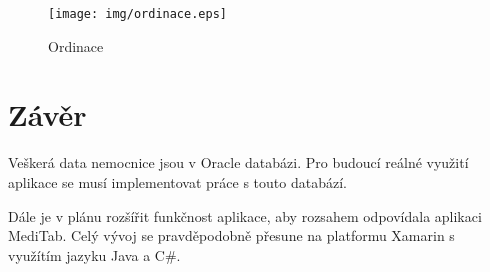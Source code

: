 \begin{figure}[H]
	\centering
	\texttt{[image: img/ordinace.eps]}
	\caption{Ordinace}
  \label{ordinace}
\end{figure}






\chapter{Závěr}

Veškerá data nemocnice jsou v Oracle databázi. Pro budoucí reálné využití aplikace se musí implementovat práce s touto databází.

Dále je v plánu rozšířit funkčnost aplikace, aby rozsahem odpovídala aplikaci MediTab. Celý vývoj se pravděpodobně přesune na platformu Xamarin s využítím jazyku Java a C\#.
